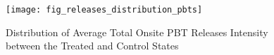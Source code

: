\begin{figure}[H]
    \centering
    \texttt{[image: fig\_releases\_distribution\_pbts]}
    \caption{Distribution of Average Total Onsite PBT Releases Intensity between the Treated and Control States}
    \label{fig:releases-distribution-pbts}
\end{figure}